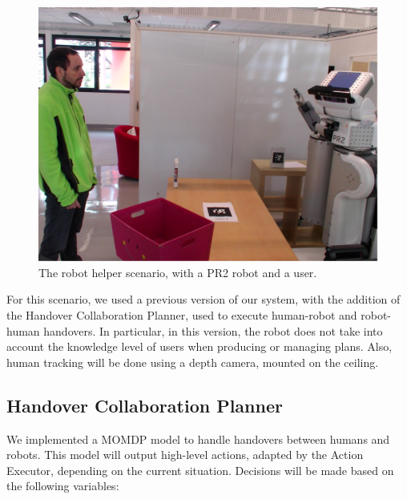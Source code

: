  \begin{figure}[ht!]
 	\centering
 	\includegraphics[scale=0.45]{img/case_study/helper/experiment.pdf}
 	\caption{The robot helper scenario, with a PR2 robot and a user.}
 	\label{fig:case_study-helper-pr2helper}
 \end{figure}

For this scenario, we used a previous version of our system, with the addition of the Handover Collaboration Planner, used to execute human-robot and robot-human handovers. In particular, in this version, the robot does not take into account the knowledge level of users when producing or managing plans. Also, human tracking will be done using a depth camera, mounted on the ceiling.

\subsection{Handover Collaboration Planner}
\label{subsec:case_study-helper-handover}
We implemented a MOMDP model to handle handovers between humans and robots. This model will output high-level actions, adapted by the Action Executor, depending on the current situation. Decisions will be made based on the following variables:


